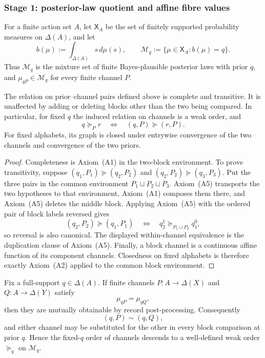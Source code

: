 \subsubsection{Stage 1: posterior-law quotient and affine fibre values}

For a finite action set $A$, let $\mathsf X_A$ be the set of finitely
supported probability measures on $\Delta(A)$, and let
\[
 b(\mu):=\int_{\Delta(A)}s\,d\mu(s),
 \qquad
 \mathcal M_q:=\{\mu\in\mathsf X_A:b(\mu)=q\}.
\]
Thus $\mathcal M_q$ is the mixture set of finite Bayes-plausible posterior
laws with prior $q$, and $\mu_{qP}\in\mathcal M_q$ for every finite channel
$P$.

\begin{lemma}\label{pt:lem:blockcoh}
The relation on prior--channel pairs defined above is complete and transitive.
It is unaffected by adding or deleting blocks other than the two being
compared.  In particular, for fixed $q$ the induced relation on channels is a
weak order, and
\[
 q\succeq_P r
 \quad\Longleftrightarrow\quad
 (q,P)\succeq(r,P).
\]
For fixed alphabets, its graph is closed under entrywise convergence of the
two channels and convergence of the two priors.
\end{lemma}

\begin{proof}
Completeness is Axiom~\textup{(A1)} in the two-block environment.  To prove
transitivity, suppose
$(q_1,P_1)\succeq(q_2,P_2)$ and
$(q_2,P_2)\succeq(q_3,P_3)$.  Put the three pairs in the common environment
$P_1\sqcup P_2\sqcup P_3$.  Axiom~\textup{(A5)} transports the two
hypotheses to that environment, Axiom~\textup{(A1)} composes them there, and
Axiom~\textup{(A5)} deletes the middle block.  Applying Axiom~\textup{(A5)}
with the ordered pair of block labels reversed gives
\[
 (q_2,P_2)\succeq(q_1,P_1)
 \quad\Longleftrightarrow\quad
 q_2^1\succeq_{P_1\sqcup P_2}q_1^0,
\]
so reversal is also canonical.  The displayed within-channel equivalence is
the duplication clause of Axiom~\textup{(A5)}.  Finally, a block channel is a
continuous affine function of its component channels.  Closedness on fixed
alphabets is therefore exactly Axiom~\textup{(A2)} applied to the common block
environment.
\end{proof}

\begin{lemma}\label{pt:lem:blackwell}\label{pt:lem:plsuff}
Fix a full-support $q\in\Delta(A)$.  If finite channels
$P:A\to\Delta(X)$ and $Q:A\to\Delta(Y)$ satisfy
\[
 \mu_{qP}=\mu_{qQ},
\]
then they are mutually obtainable by record post-processing.  Consequently
\[
 (q,P)\sim(q,Q),
\]
and either channel may be substituted for the other in every block
comparison at prior $q$.  Hence the fixed-$q$ order of channels descends to a
well-defined weak order $\succeq_q$ on $\mathcal M_q$.
\end{lemma}

